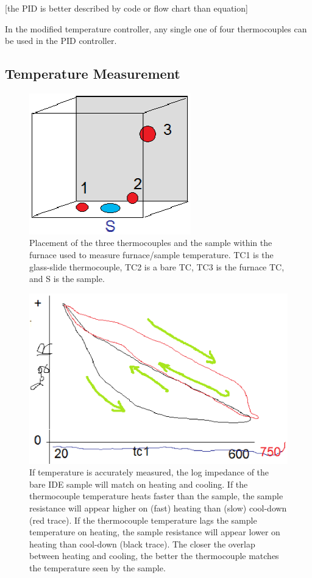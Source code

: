 	[the PID is better described by code or flow chart than equation]


	In the modified temperature controller, any single one of four thermocouples can be used in the PID controller.	
	
	

	\subsection{Temperature Measurement}
	
	\begin{figure}
		\includegraphics[width=70mm]{images/oven_tc_placement.eps}
		\caption{Placement of the three thermocouples and the sample within the furnace used to measure furnace/sample temperature.  TC1 is the glass-slide thermocouple, TC2 is a bare TC, TC3 is the furnace TC, and S is the sample.}
		\label{f:furnace_tc}
	\end{figure}
	
	\begin{figure}
		\includegraphics[width=150mm]{images/plot_logR_vs_tc1_and_tc3.eps}
		\caption{If temperature is accurately measured, the log impedance of the bare IDE sample will match on heating and cooling.  If the thermocouple temperature heats faster than the sample, the sample resistance will appear higher on (fast) heating than (slow) cool-down (red trace).  If the thermocouple temperature lags the sample temperature on heating, the sample resistance will appear lower on heating than cool-down (black trace).  The closer the overlap between heating and cooling, the better the thermocouple matches the temperature seen by the sample. }
		\label{f:logR_vs_t1_and_t3}
	\end{figure}
	
